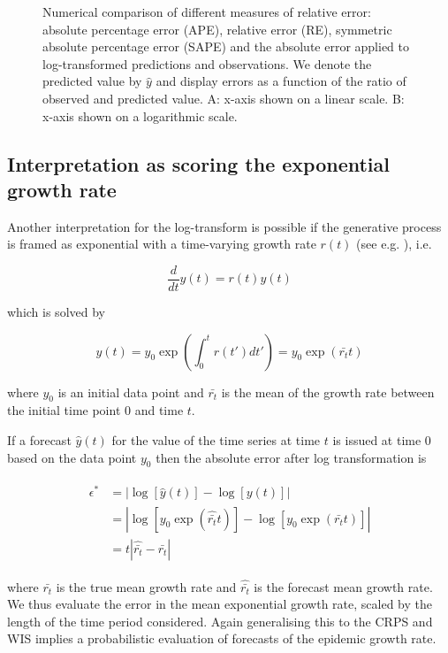\documentclass[10pt,letterpaper]{article}
\begin{document}
\begin{figure}[h!]
\centering
\caption{Numerical comparison of different measures of relative error: absolute percentage error (APE), relative error (RE), symmetric absolute percentage error (SAPE) and the absolute error applied to log-transformed predictions and observations. We denote the predicted value by $\hat{y}$ and display errors as a function of the ratio of observed and predicted value. A: x-axis shown on a linear scale. B: x-axis shown on a logarithmic scale.}
\label{fig:SAPE}
\end{figure}

\subsection*{Interpretation as scoring the exponential growth rate}
\label{sec:methods:growthrate}

Another interpretation for the log-transform is possible if the generative process is framed as exponential with a time-varying growth rate $r(t)$ (see e.g. \cite{wallingaHowGenerationIntervals2007}), i.e.
\begin{linenomath*}
\begin{equation}
\frac{d}{dt}y(t) = r(t)y(t)
\end{equation}
\end{linenomath*}
%
which is solved by
%
\begin{linenomath*}
\begin{equation}
y(t) = y_0 \exp \left( \int_0^t r(t') dt' \right) = y_0 \exp (\bar{r_t}t)
\end{equation}
\end{linenomath*}
where $y_0$ is an initial data point and $\bar{r_t}$ is the mean of the growth rate between the initial time point $0$ and time $t$.

If a forecast $\hat{y}(t)$ for the value of the time series at time $t$ is issued at time 0 based on the data point $y_0$ then the absolute error after log transformation is
%
\begin{linenomath*}
\begin{align}
\begin{split}
\epsilon^* &= \left| \log \left[ \hat{y}( t ) \right] - \log \left[ y ( t ) \right] \right|\\
           &= \left| \log \left[ y_0 \exp (\hat{\bar{r_t}} t ) \right] - \log \left[ y_0 \exp (\bar{r_t}t) \right] \right|\\
           &= t \left| \hat{\bar{r_t}} - \bar{r_t} \right|
\end{split}
\end{align}
\end{linenomath*}
%
where $\bar{r_t}$ is the true mean growth rate and $\hat{\bar{r_t}}$ is the forecast mean growth rate. We thus evaluate the error in the mean exponential growth rate, scaled by the length of the time period considered. Again generalising this to the CRPS and WIS implies a probabilistic evaluation of forecasts of the epidemic growth rate.
\end{document}

